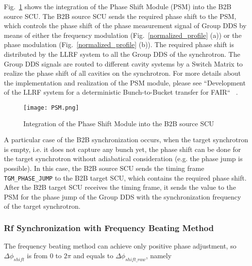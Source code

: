 Fig.~\ref{PSM} shows the integration of the Phase Shift Module (PSM) into the B2B source SCU. The B2B source SCU sends the required phase shift to the \gls{PSM}, which controls the phase shift of the phase measurement signal of Group DDS by means of either the frequency modulation (Fig.~\ref{normalized_profile} (a)) or the phase modulation (Fig.~\ref{normalized_profile} (b)). The required phase shift is distributed by the LLRF system to all the Group DDS of the synchrotron. The Group DDS signals are routed to different cavity systems by a Switch Matrix to realize the phase shift of all cavities on the synchrotron. For more details about the implementation and realization of the PSM module, please see ``Development of the LLRF system for a deterministic Bunch-to-Bucket transfer for FAIR`` ~\cite{ferrand_development_????}.
  \begin{figure}[!htb]
   \centering   
   \texttt{[image: PSM.png]}
   \caption{Integration of the Phase Shift Module into the B2B source SCU}
   \label{PSM}
\end{figure}                     

A particular case of the B2B synchronization occurs, when the target synchrotron is empty, i.e. it does not capture any bunch yet, the phase shift can be done for the target synchrotron without adiabatical consideration (e.g. the phase jump is possible). In this case, the B2B source SCU sends the timing frame \verb|TGM_PHASE_JUMP| to the B2B target SCU, which contains the required phase shift. After the B2B target SCU receives the timing frame, it sends the value to the PSM for the phase jump of the Group DDS with the synchronization frequency of the target synchrotron.

\subsubsection{Rf Synchronization with Frequency Beating Method}

The frequency beating method can achieve only positive phase adjustment, so $\Delta \phi_\mathit{shift}$ is from $0$ to $2\pi$ and equals to $\Delta \phi_\mathit{shift\_raw}$, namely
%
%
%
%


